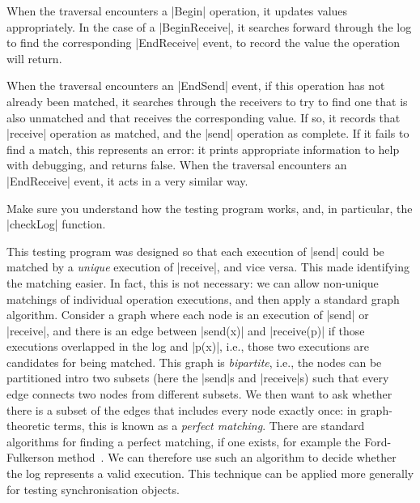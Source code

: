 When the traversal encounters a |Begin| operation, it updates values
appropriately.  In the case of a |BeginReceive|, it searches forward through
the log to find the corresponding |EndReceive| event, to record the value the
operation will return.

When the traversal encounters an |EndSend| event, if this operation has not
already been matched, it searches through the receivers to try to find one
that is also unmatched and that receives the corresponding value.  If so, it
records that |receive| operation as matched, and the |send| operation as
complete.  If it fails to find a match, this represents an error: it prints
appropriate information to help with debugging, and returns false.  When the
traversal encounters an |EndReceive| event, it acts in a very similar way.

\begin{instruction}
Make sure you understand how the testing program works, and, in particular,
the |checkLog| function.
\end{instruction}

This testing program was designed so that each execution of |send| could be
matched by a \emph{unique} execution of |receive|, and vice versa.  This made
identifying the matching easier.  In fact, this is not necessary: we can allow
non-unique matchings of individual operation executions, and then apply a
standard graph algorithm.  Consider a graph where each node is an execution of
|send| or |receive|, and there is an edge between |send(x)| and |receive(p)|
if those executions overlapped in the log and |p(x)|, i.e., those two
executions are candidates for being matched.  This graph is \emph{bipartite},
i.e., the nodes can be partitioned intro two subsets (here the |send|s and
|receive|s) such that every edge connects two nodes from different subsets.
We then want to ask whether there is a subset of the edges that includes every
node exactly once: in graph-theoretic terms, this is known as a \emph{perfect
  matching}.  There are standard algorithms for finding a perfect matching, if
one exists, for example the Ford-Fulkerson method~\cite{ford-fulkerson, CLRS}.
We can therefore use such an algorithm to decide whether the log represents a
valid execution.  This technique can be applied more generally for testing
synchronisation objects.

